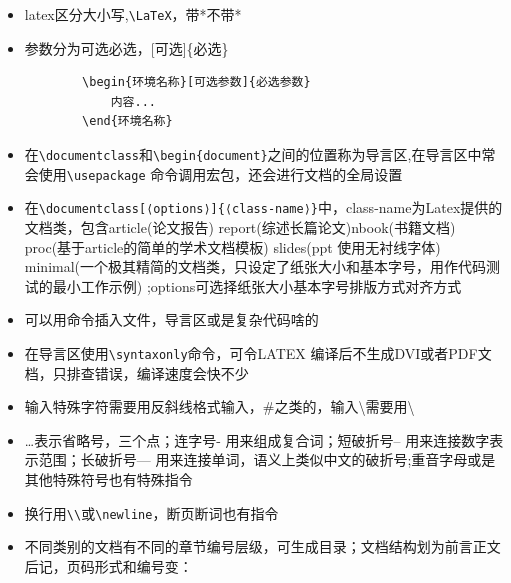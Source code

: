 \documentclass{article}
\begin{document}
\begin{itemize}
	\item latex区分大小写,\verb|\LaTeX|，带*不带*
	\item 参数分为可选必选，[可选]\{必选\}
	\begin{lstlisting}
		\begin{环境名称}[可选参数]{必选参数}
			内容...
		\end{环境名称}
	\end{lstlisting}
	\item 在\verb|\documentclass|和\verb|\begin{document}|之间的位置称为导言区,在导言区中常会使用\verb|\usepackage| 命令调用宏包，还会进行文档的全局设置
	\item 在\verb|\documentclass[⟨options⟩]{⟨class-name⟩}|中，class-name为Latex提供的文档类，包含article(论文报告) report(综述长篇论文)nbook(书籍文档) proc(基于article的简单的学术文档模板) slides(ppt 使用无衬线字体) minimal(一个极其精简的文档类，只设定了纸张大小和基本字号，用作代码测
	试的最小工作示例) ;options可选择纸张大小基本字号排版方式对齐方式
	\item 可以用\verb||命令插入文件，导言区或是复杂代码啥的
	\item 在导言区使用\verb|\syntaxonly|命令，可令LATEX 编译后不生成DVI或者PDF文档，只排查错误，编译速度会快不少
	\item 输入特殊字符需要用反斜线格式输入，\#之类的，输入\textbackslash 需要用\textbackslash
	\item \ldots 表示省略号，三个点；连字号- 用来组成复合词；短破折号– 用来连接数字表示范围；长破折号— 用来连接单词，语义上类似中文的破折号;重音字母或是其他特殊符号也有特殊指令
	\item 换行用\verb|\\|或\verb|\newline|，断页断词也有指令
	\item 不同类别的文档有不同的章节编号层级，可生成目录；文档结构划为前言正文后记，页码形式和编号变：\\

\end{itemize}
\end{document}
